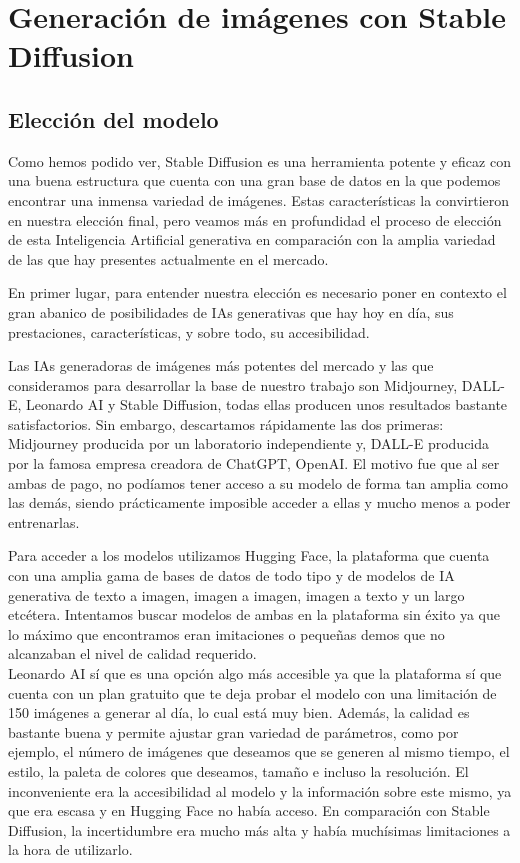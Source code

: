 \chapter{Generación de imágenes con Stable Diffusion}
\label{cap:genimgsia}

\section{Elección del modelo}

Como hemos podido ver, Stable Diffusion es una herramienta potente y eficaz con una buena estructura que cuenta con una gran base de datos en la que podemos encontrar una inmensa variedad de imágenes. Estas características la convirtieron en nuestra elección final, pero veamos más en profundidad el proceso de elección de esta Inteligencia Artificial generativa en comparación con la amplia variedad de las que hay presentes actualmente en el mercado. 

En primer lugar, para entender nuestra elección es necesario poner en contexto el gran abanico de posibilidades de IAs generativas que hay hoy en día, sus prestaciones, características, y sobre todo, su accesibilidad. 

Las IAs generadoras de imágenes más potentes del mercado y las que consideramos para desarrollar la base de nuestro trabajo son Midjourney, DALL-E, Leonardo AI y Stable Diffusion, todas ellas producen unos resultados bastante satisfactorios. Sin embargo, descartamos rápidamente las dos primeras: Midjourney producida por un laboratorio independiente y,
DALL-E producida por la famosa empresa creadora de ChatGPT, OpenAI. El motivo fue que al ser ambas de pago, no podíamos tener acceso a su modelo de forma tan amplia como las demás, siendo prácticamente imposible acceder a ellas y mucho menos a poder entrenarlas. 

Para acceder a los modelos utilizamos Hugging Face, la plataforma  que cuenta con una amplia gama de bases de datos de todo tipo y de modelos de IA generativa de texto a imagen, imagen a imagen, imagen a texto y un largo etcétera. Intentamos buscar modelos de ambas en la plataforma sin éxito ya que lo máximo que encontramos eran imitaciones o pequeñas demos que no alcanzaban el nivel de calidad requerido. \\


Leonardo AI sí que es una opción algo más accesible ya que la plataforma sí que cuenta con un plan gratuito que te deja probar el modelo con una limitación de 150 imágenes a generar al día, lo cual está muy bien. Además, la calidad es bastante buena y permite ajustar gran variedad de parámetros, como por ejemplo, el número de imágenes que deseamos que se generen al mismo tiempo, el estilo, la paleta de colores que deseamos, tamaño e incluso la resolución. El inconveniente era la accesibilidad al modelo y la información sobre este mismo, ya que era escasa y en Hugging Face no había acceso. En comparación con Stable Diffusion, la incertidumbre era mucho más alta y había muchísimas limitaciones a la hora de utilizarlo. \\

